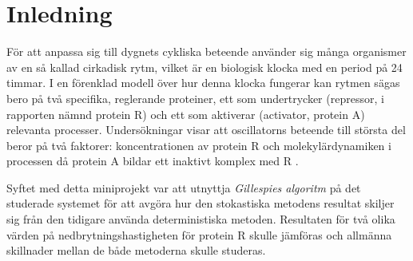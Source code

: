\section{Inledning}
\label{sec:inledning}
För att anpassa sig till dygnets cykliska beteende använder sig många organismer av en så kallad cirkadisk rytm, vilket är en biologisk klocka med en period på 24 timmar. I en förenklad modell över hur denna klocka fungerar kan rytmen sägas bero på två specifika, reglerande proteiner, ett som undertrycker (repressor, i rapporten nämnd protein R) och ett som aktiverar (activator, protein A) relevanta processer. Undersökningar visar att oscillatorns beteende till största del beror på två faktorer: koncentrationen av protein R och molekylärdynamiken i processen då protein A bildar ett inaktivt komplex med R \cite{ref:rapport}.

Syftet med detta miniprojekt var att utnyttja \emph{Gillespies algoritm} på det studerade systemet för att avgöra hur den stokastiska metodens resultat skiljer sig från den tidigare använda \cite{ref:bestarapportenyao} deterministiska metoden. Resultaten för två olika värden på nedbrytningshastigheten för protein R skulle jämföras och allmänna skillnader mellan de både metoderna skulle studeras.

